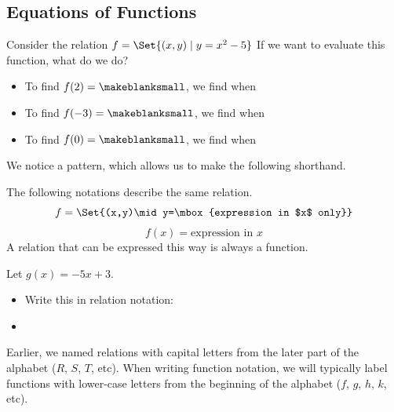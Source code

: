 \subsection{Equations of Functions} 
\begin{Example}Consider the relation $f=\Set{(x,y)\mid y=x^2-5}$\lbr
{}\lbr\makeblankfill{}\lbr
If we want to evaluate this function, what do we do?
\begin{itemize}
\item To find $f(2)=\makeblanksmall$, we find \makeblanksmall when \makeblank[1in]\makeblanknewf
\item To find $f(-3)=\makeblanksmall$, we find \makeblanksmall when \makeblank[1in]\makeblanknewf
\item To find $f(0)=\makeblanksmall$, we find \makeblanksmall when \makeblank[1in]\makeblanknewf
\end{itemize}
We notice a pattern, which allows us to make the following shorthand.
\end{Example}
\begin{definition}
The following notations describe the same relation.
$$f=\Set{(x,y)\mid y=\mbox{expression in $x$ only}}$$
$$f(x)=\mbox{expression in $x$}$$
A relation that can be expressed this way is always a function.
\end{definition}
\begin{Example}
Let $g(x)=-5x+3$.
\begin{itemize}
\item Write this in relation notation: \makeblank
\item {}
\end{itemize}
\end{Example}
\begin{Note}Earlier, we named relations with capital letters from the later part of the alphabet ($R$, $S$, $T$, etc). When writing function notation, we will typically label functions with lower-case letters from the beginning of the alphabet ($f$, $g$, $h$, $k$, etc).\end{Note}